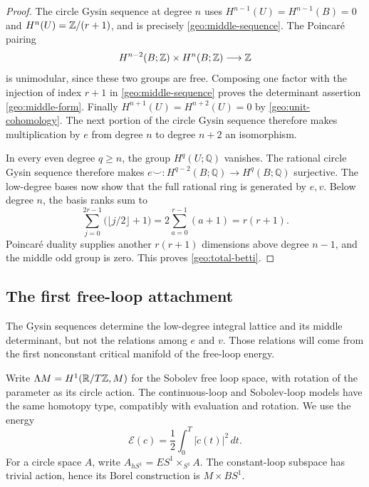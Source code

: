 \begin{proof}
The circle Gysin sequence at degree $n$ uses
$H^{n-1}(U)=H^{n-1}(B)=0$ and
$H^n(U)=\mathbb Z/(r+1)$, and is precisely
\eqref{geo:middle-sequence}.  The Poincar\'e pairing
\[
 H^{n-2}(B;\mathbb Z)\times H^n(B;\mathbb Z)\longrightarrow\mathbb Z
\]
is unimodular, since these two groups are free.  Composing one
factor with the injection of index $r+1$ in
\eqref{geo:middle-sequence} proves the determinant assertion
\eqref{geo:middle-form}.
Finally $H^{n+1}(U)=H^{n+2}(U)=0$ by
\eqref{geo:unit-cohomology}.  The next portion of the circle
Gysin sequence therefore makes multiplication by $e$ from degree
$n$ to degree $n+2$ an isomorphism.

In every even degree $q\ge n$, the group $H^q(U;\mathbb Q)$
vanishes.  The rational circle Gysin sequence therefore makes
$e\smile:H^{q-2}(B;\mathbb Q)\to H^q(B;\mathbb Q)$
surjective.  The low-degree bases now show that the full rational
ring is generated by $e,v$.  Below degree $n$, the basis ranks
sum to
\[
 \sum_{j=0}^{2r-1}\bigl(\lfloor j/2\rfloor+1\bigr)
 =2\sum_{a=0}^{r-1}(a+1)=r(r+1).
\]
Poincar\'e duality supplies another $r(r+1)$ dimensions above
degree $n-1$, and the middle odd group is zero.  This proves
\eqref{geo:total-betti}.
\end{proof}

\subsection{The first free-loop attachment}

The Gysin sequences determine the low-degree integral lattice and its middle
determinant, but not the relations among $e$ and $v$.  Those
relations will come from the first nonconstant critical manifold
of the free-loop energy.

Write $\Lambda M=H^1(\mathbb R/T\mathbb Z,M)$ for the Sobolev free loop
space, with rotation of the parameter as its circle action.
The continuous-loop and Sobolev-loop models have the same homotopy
type, compatibly with evaluation and rotation.  We use the energy
\[
 \mathcal E(c)=\frac12\int_0^T|\dot c(t)|^2\,dt.
\]
For a circle space $A$, write $A_{hS^1}=ES^1\times_{S^1}A$.
The constant-loop subspace has trivial action, hence its Borel
construction is $M\times BS^1$.

